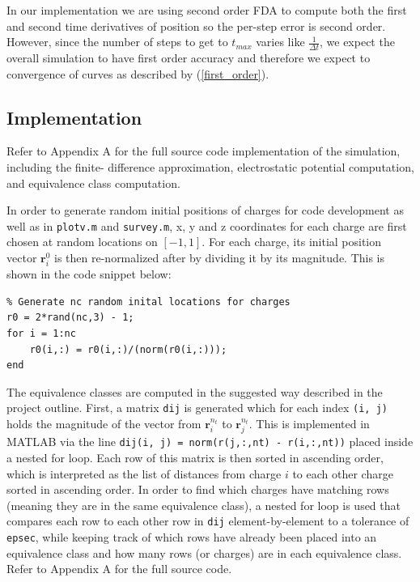 \documentclass[10pt]{article}
\def\code#1{\texttt{#1}} %
\begin{document}
In our implementation we are using second order FDA to compute both the first and second time 
derivatives of position so the per-step error is second order. However, since the number of steps to
get to $t_{max}$ varies like $\frac{1}{\Delta t}$, we expect the overall simulation to have first order
accuracy and therefore we expect to convergence of curves as described by (\ref{first_order}).

\subsection*{Implementation}

Refer to Appendix A for the full source code implementation of the simulation, including the finite-
difference approximation, electrostatic potential computation, and equivalence class computation.  

In order to generate random initial positions of charges for code development as well as in 
\code{plotv.m} and \code{survey.m}, x, y and z coordinates for each charge are first chosen at random
locations on $[-1,1]$. For each charge, its initial position vector $\mathbf{r}_i^0$ is then 
re-normalized after by dividing it by its magnitude. This is shown in the code snippet below:
\begin{verbatim}
% Generate nc random inital locations for charges
r0 = 2*rand(nc,3) - 1;
for i = 1:nc
    r0(i,:) = r0(i,:)/(norm(r0(i,:)));
end
\end{verbatim}

The equivalence classes are computed in the suggested way described in the project outline. First, a 
matrix \code{dij} is generated which for each index \code{(i, j)} holds the magnitude of the vector from 
$\mathbf{r}_i^{n_t}$ to $\mathbf{r}_j^{n_t}$. This is implemented in MATLAB via the line 
\code{dij(i, j) = norm(r(j,:,nt) - r(i,:,nt))} placed inside a nested for loop. Each row of this matrix is 
then sorted in ascending order, which is interpreted as the list of distances from charge $i$ to each other
charge sorted in ascending order. In order to find which charges have matching rows (meaning they are in 
the same equivalence class), a nested for loop is used that compares each row to each other row in \code{dij}
element-by-element to a tolerance of \code{epsec}, while keeping track of which rows have 
already been placed into an equivalence class and how many rows (or charges) are in each equivalence class. 
Refer to Appendix A for the full source code. 
\end{document}

